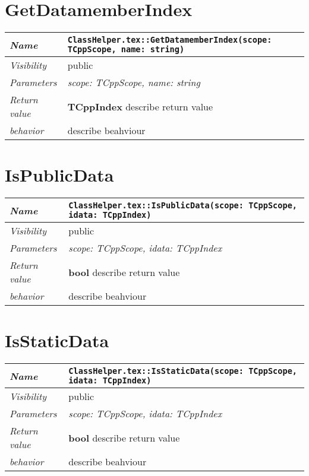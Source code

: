  \section{GetDatamemberIndex}
\begin{longtable}{p{3cm} @{\hskip 1cm} p{12cm}}
 \hline
\textit{Name} & \texttt{ClassHelper.tex::GetDatamemberIndex(scope: TCppScope, name: string)}\\
\hline
 \textit{Visibility} & public\\
\hline
\textit{Parameters} & \textit{scope: TCppScope, name: string}\\
\hline
\textit{Return value} & \textbf{ TCppIndex} describe return value\\
  \hline
 \textit{behavior} & describe beahviour \\
\hline
\end{longtable} \pagebreak
 \section{IsPublicData}
\begin{longtable}{p{3cm} @{\hskip 1cm} p{12cm}}
 \hline
\textit{Name} & \texttt{ClassHelper.tex::IsPublicData(scope: TCppScope, idata: TCppIndex)}\\
\hline
 \textit{Visibility} & public\\
\hline
\textit{Parameters} & \textit{scope: TCppScope, idata: TCppIndex}\\
\hline
\textit{Return value} & \textbf{ bool} describe return value\\
  \hline
 \textit{behavior} & describe beahviour \\
\hline
\end{longtable} \pagebreak
 \section{IsStaticData}
\begin{longtable}{p{3cm} @{\hskip 1cm} p{12cm}}
 \hline
\textit{Name} & \texttt{ClassHelper.tex::IsStaticData(scope: TCppScope, idata: TCppIndex)}\\
\hline
 \textit{Visibility} & public\\
\hline
\textit{Parameters} & \textit{scope: TCppScope, idata: TCppIndex}\\
\hline
\textit{Return value} & \textbf{ bool} describe return value\\
  \hline
 \textit{behavior} & describe beahviour \\
\hline
\end{longtable} \pagebreak
